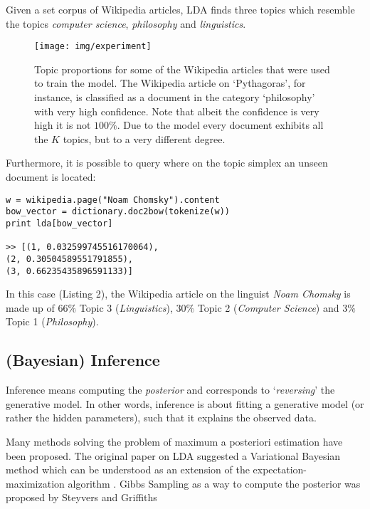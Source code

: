 \documentclass[a4paper,ngerman, english]{atseminar}
\begin{document}
\noindent
Given a set corpus of Wikipedia articles, LDA finds three topics which resemble the topics \textit{computer science},
\textit{philosophy} and \textit{linguistics}. 


\begin{figure}
\centering
\texttt{[image: img/experiment]}
 \caption{Topic proportions for some of the Wikipedia articles that were used to train the model. The Wikipedia
 article on `Pythagoras', for instance, is classified as a document in the category `philosophy' with very high confidence.
 Note that albeit the confidence is very high it is not $100\%$. Due to the model every document exhibits all the $K$ topics, but to a very different degree.}
   \label{fig:experiments}
\end{figure}

\noindent
Furthermore, it is possible to query where on the topic simplex an unseen document is located:

\begin{lstlisting}[label=noam,caption=\; Query for a document]
w = wikipedia.page("Noam Chomsky").content
bow_vector = dictionary.doc2bow(tokenize(w))
print lda[bow_vector]

>> [(1, 0.032599745516170064), 
(2, 0.30504589551791855),
(3, 0.66235435896591133)]
\end{lstlisting}


In this case (Listing 2), the Wikipedia article on the linguist \textit{Noam Chomsky} is made up of
$66\%$ Topic 3 (\textit{Linguistics}), $30\%$ Topic 2 (\textit{Computer Science}) and
$3\%$ Topic 1 (\textit{Philosophy}).


\subsection{(Bayesian) Inference}

Inference means computing the \textit{posterior} and corresponds to `\textit{reversing}' the generative model.
In other words, inference is about fitting a generative model (or rather the hidden parameters), such that it explains the observed data.

Many methods solving the problem of maximum a posteriori estimation have been proposed. The original paper on LDA \cite{blei2003latent} suggested a Variational Bayesian method which can be understood as an extension of the expectation-maximization algorithm \cite{fox2012tutorial}. Gibbs Sampling as a way to compute the
posterior was proposed by Steyvers and Griffiths \cite{steyvers2007probabilistic}	 \\
\end{document}
